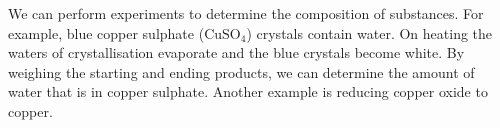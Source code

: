 We can perform experiments to determine the composition of substances. For example, blue copper sulphate ($\text{CuSO}_{4}$) crystals contain water. On heating the waters of crystallisation evaporate and the blue crystals become white. By weighing the starting and ending products, we can determine the amount of water that is in copper sulphate. Another example is reducing copper oxide to copper. 

    \noindent


